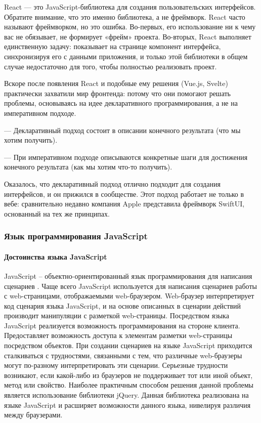 React — это JavaScript-библиотека для создания пользовательских интерфейсов. Обратите внимание, что это именно библиотека, а не фреймворк. React часто называют фреймворком, но это ошибка. Во-первых, его использование ни к чему вас не обязывает, не формирует «фрейм» проекта. Во-вторых, React выполняет единственную задачу: показывает на странице компонент интерфейса, синхронизируя его с данными приложения, и только этой библиотеки в общем случае недостаточно для того, чтобы полностью реализовать проект.

Вскоре после появления React и подобные ему решения (Vue.js, Svelte) практически захватили мир фронтенда: потому что они помогают решать проблемы, основываясь на идее декларативного программирования, а не на императивном подходе.

— Декларативный подход состоит в описании конечного результата (что мы хотим получить).

— При императивном подходе описываются конкретные шаги для достижения конечного результата (как мы хотим что-то получить).

Оказалось, что декларативный подход отлично подходит для создания интерфейсов, и он прижился в сообществе. Этот подход работает не только в вебе: сравнительно недавно компания Apple представила фреймворк SwiftUI, основанный на тех же принципах.


\subsubsection{Язык программирования JavaScript}

\paragraph{Достоинства языка JavaScript}

JavaScript – объектно-ориентированный язык программирования для написания сценариев \cite{javascript}. Чаще всего JavaScript используется для написания сценариев работы с web-страницами, отображаемыми web-браузером. Web-бра\-у\-зер интерпретирует код сценария языка JavaScript, и на основе описанных в сценарии действий производит манипуляции с разметкой web-страницы. Посредством языка JavaScript реализуется возможность программирования на стороне клиента. Предоставляет возможность доступа к элементам разметки web-страницы посредством объектов. При создании сценариев на языке JavaScript приходится сталкиваться с трудностями, связанными с тем, что различные web-браузеры могут по-разному интерпретировать эти сценарии. Серьезные трудности возникают, если какой-либо из браузеров не поддерживает тот или иной объект, метод или свойство. Наиболее практичным способом решения данной проблемы является использование библиотеки jQuery. Данная библиотека реализована на языке JavaScript и расширяет возможности данного языка, нивелируя различия между браузерами.


